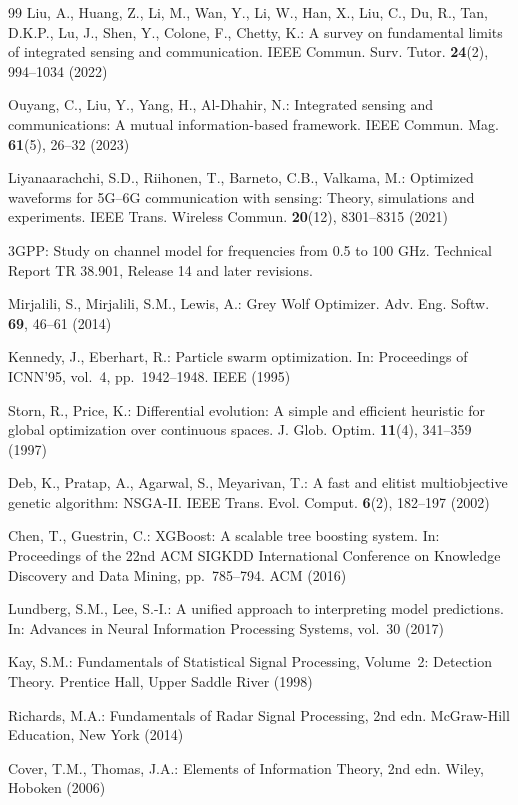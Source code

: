 \documentclass[runningheads]{llncs}
\begin{document}
\clearpage
\begin{thebibliography}{99}
Liu, A., Huang, Z., Li, M., Wan, Y., Li, W., Han, X., Liu, C., Du, R., Tan, D.K.P., Lu, J., Shen, Y., Colone, F., Chetty, K.: A survey on fundamental limits of integrated sensing and communication. IEEE Commun. Surv. Tutor. \textbf{24}(2), 994--1034 (2022)

Ouyang, C., Liu, Y., Yang, H., Al-Dhahir, N.: Integrated sensing and communications: A mutual information-based framework. IEEE Commun. Mag. \textbf{61}(5), 26--32 (2023)

Liyanaarachchi, S.D., Riihonen, T., Barneto, C.B., Valkama, M.: Optimized waveforms for 5G--6G communication with sensing: Theory, simulations and experiments. IEEE Trans. Wireless Commun. \textbf{20}(12), 8301--8315 (2021)

3GPP: Study on channel model for frequencies from 0.5 to 100 GHz. Technical Report TR 38.901, Release 14 and later revisions.

Mirjalili, S., Mirjalili, S.M., Lewis, A.: Grey Wolf Optimizer. Adv. Eng. Softw. \textbf{69}, 46--61 (2014)

Kennedy, J., Eberhart, R.: Particle swarm optimization. In: Proceedings of ICNN'95, vol.~4, pp.~1942--1948. IEEE (1995)

Storn, R., Price, K.: Differential evolution: A simple and efficient heuristic for global optimization over continuous spaces. J. Glob. Optim. \textbf{11}(4), 341--359 (1997)

Deb, K., Pratap, A., Agarwal, S., Meyarivan, T.: A fast and elitist multiobjective genetic algorithm: NSGA-II. IEEE Trans. Evol. Comput. \textbf{6}(2), 182--197 (2002)

Chen, T., Guestrin, C.: XGBoost: A scalable tree boosting system. In: Proceedings of the 22nd ACM SIGKDD International Conference on Knowledge Discovery and Data Mining, pp.~785--794. ACM (2016)

Lundberg, S.M., Lee, S.-I.: A unified approach to interpreting model predictions. In: Advances in Neural Information Processing Systems, vol.~30 (2017)

Kay, S.M.: Fundamentals of Statistical Signal Processing, Volume~2: Detection Theory. Prentice Hall, Upper Saddle River (1998)

Richards, M.A.: Fundamentals of Radar Signal Processing, 2nd edn. McGraw-Hill Education, New York (2014)

Cover, T.M., Thomas, J.A.: Elements of Information Theory, 2nd edn. Wiley, Hoboken (2006)
\end{thebibliography}
\end{document}
